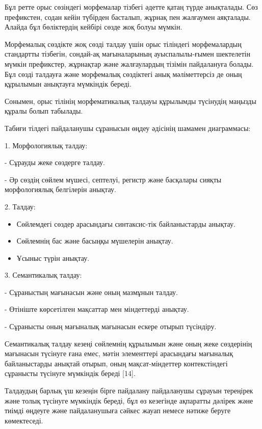 \begin{multicols}{2}
Бұл ретте орыс сөзіндегі морфемалар тізбегі әдетте қатаң түрде
анықталады. Сөз префикстен, содан кейін түбірден басталып, жұрнақ пен
жалғаумен аяқталады. Алайда бұл бөліктердің кейбірі сөзде жоқ болуы
мүмкін.

Морфемалық сөздікте жоқ сөзді талдау үшін орыс тіліндегі морфемалардың
стандартты тізбегін, сондай-ақ мағыналарының ауыспалылы-ғымен шектелетін
мүмкін префикстер, жұрнақтар және жалғаулардың тізімін пайдалануға
болады. Бұл сөзді талдауға және морфемалық сөздіктегі анық мәліметтерсіз
де оның құрылымын анықтауға мүмкіндік береді.

Сонымен, орыс тілінің морфематикалық талдауы құрылымды түсінудің маңызды
құралы болып табылады.

Табиғи тілдегі пайдаланушы сұранысын өңдеу әдісінің шамамен диаграммасы:

1. Морфологиялық талдау:

\hspace{0.5cm}- Сұрауды жеке сөздерге талдау.

\hspace{0.5cm}- Әр сөздің сөйлем мүшесі, септелуі, регистр және басқалары сияқты
морфологиялық белгілерін анықтау.

2. Талдау:

\begin{itemize}
  \setlength{\itemindent}{1cm} 
\item
  Сөйлемдегі сөздер арасындағы синтаксис-тік байланыстарды анықтау.
\item
  Сөйлемнің бас және басыңқы мүшелерін анықтау.
\item
  Ұсыныс түрін анықтау.
\end{itemize}

3. Семантикалық талдау:

\hspace{0.5cm}- Сұраныстың мағынасын және оның мазмұнын талдау.

\hspace{0.5cm}- Өтініште көрсетілген мақсаттар мен міндеттерді анықтау.

\hspace{0.5cm}- Сұранысты оның мағыналық мағынасын ескере отырып түсіндіру.

Семантикалық талдау кезеңі сөйлемнің құрылымын және оның жеке сөздерінің
мағынасын түсінуге ғана емес, мәтін элементтері арасындағы мағыналық
байланыстарды анықтай отырып, оның мақсат-міндеттер контекстіндегі
сұранысты түсінуге мүмкіндік береді {[}14{]}.

Талдаудың барлық үш кезеңін бірге пайдалану пайдаланушы сұрауын
тереңірек және толық түсінуге мүмкіндік береді, бұл өз кезегінде
ақпаратты дәлірек және тиімді өңдеуге және пайдаланушыға сәйкес жауап
немесе нәтиже беруге көмектеседі.


\end{multicols}
